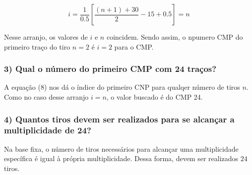 \documentclass[12pt,a4paper]{article}
\begin{document}
$$    i = \frac{1}{0.5} [ \frac{(n+1) + 30}{2} - 15 + 0.5] = n $$

Nesse arranjo, os valores de $i$ e $n$ coincidem. Sendo assim, o npumero CMP do primeiro traço do tiro $n=2$ é $i=2$ para o CMP. 



\subsubsection{3) Qual o número do primeiro CMP com 24 traços?}

A equação (8) nos dá o índice do primeiro CNP para qualqer número de tiros $n$. Como no caso desse arranjo $i=n$, o valor buscado é do CMP 24. 




\subsubsection{4) Quantos tiros devem ser realizados para se alcançar a multiplicidade de 24?}

Na base fixa, o número de tiros necessários para alcançar uma multiplicidade específica é igual à própria multiplicidade. Dessa forma, devem ser realizados $24$ tiros. 
\end{document}
